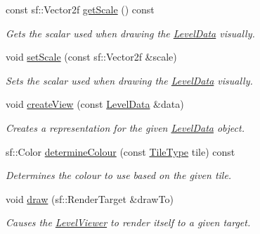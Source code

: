 \begin{DoxyCompactItemize}
const sf\+::\+Vector2f \hyperlink{classLevelViewer_a14f5f87a2bd1169ad44b83cc01c890d3}{get\+Scale} () const 
\begin{DoxyCompactList}\small\item\em Gets the scalar used when drawing the \hyperlink{classLevelData}{Level\+Data} visually. \end{DoxyCompactList}\item 
void \hyperlink{classLevelViewer_a8b6f7c3c274f04b91b9005e51c7325ef}{set\+Scale} (const sf\+::\+Vector2f \&scale)
\begin{DoxyCompactList}\small\item\em Sets the scalar used when drawing the \hyperlink{classLevelData}{Level\+Data} visually. \end{DoxyCompactList}\item 
void \hyperlink{classLevelViewer_a09531b36a9fcc93cd3e2674da74ddd15}{create\+View} (const \hyperlink{classLevelData}{Level\+Data} \&data)
\begin{DoxyCompactList}\small\item\em Creates a representation for the given \hyperlink{classLevelData}{Level\+Data} object. \end{DoxyCompactList}\item 
sf\+::\+Color \hyperlink{classLevelViewer_a86cad499fe0b7978969dd8ba9cbb311f}{determine\+Colour} (const \hyperlink{LevelData_8hpp_a47dee72188473c57343127b1a5843398}{Tile\+Type} tile) const 
\begin{DoxyCompactList}\small\item\em Determines the colour to use based on the given tile. \end{DoxyCompactList}\item 
void \hyperlink{classLevelViewer_a8db6d8e5a3239dc83260c31c047e9d5b}{draw} (sf\+::\+Render\+Target \&draw\+To)
\begin{DoxyCompactList}\small\item\em Causes the \hyperlink{classLevelViewer}{Level\+Viewer} to render itself to a given target. \end{DoxyCompactList}\end{DoxyCompactItemize}
